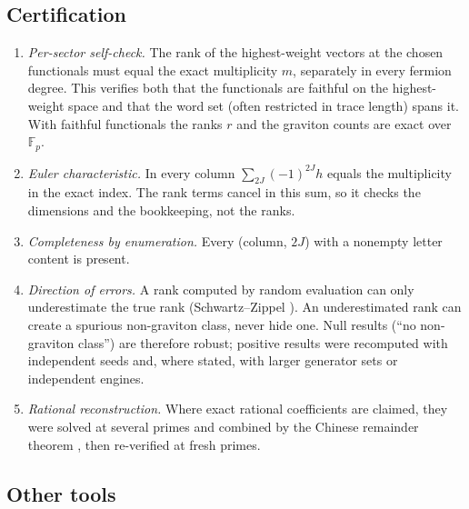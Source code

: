 \documentclass[11pt]{article}
\begin{document}
\subsection{Certification}\label{sec:cert}

\begin{enumerate}[label=(\alph*)]
\item \emph{Per-sector self-check.} The rank of the highest-weight vectors at the chosen functionals must equal the
exact multiplicity $m$, separately in every fermion degree. This verifies both that the functionals are faithful on
the highest-weight space and that the word set (often restricted in trace length) spans it. With faithful
functionals the ranks $r$ and the graviton counts are exact over $\mathbb F_p$.
\item \emph{Euler characteristic.} In every column $\sum_{2J}(-1)^{2J}h$ equals the multiplicity in the exact index.
The rank terms cancel in this sum, so it checks the dimensions and the bookkeeping, not the ranks.
\item \emph{Completeness by enumeration.} Every (column, $2J$) with a nonempty letter content is present.
\item \emph{Direction of errors.} A rank computed by random evaluation can only underestimate the true rank
(Schwartz--Zippel \cite{Schwartz,Zippel}). An underestimated rank can create a spurious non-graviton class, never
hide one. Null results (``no non-graviton class'') are therefore robust; positive results were recomputed with
independent seeds and, where stated, with larger generator sets or independent engines.
\item \emph{Rational reconstruction.} Where exact rational coefficients are claimed, they were solved at several
primes and combined by the Chinese remainder theorem \cite{vMS,Peraro}, then re-verified at fresh primes.
\end{enumerate}

\subsection{Other tools}\label{sec:tools}
\end{document}
